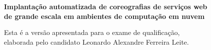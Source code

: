 \documentclass[11pt,twoside,a4paper]{book}
\begin{document}
%
%
%
\newpage
\thispagestyle{empty}
    \begin{center}
        \vspace*{2.3 cm}
        \textbf{\Large{Implantação automatizada de coreografias de serviços web \\
    de grande escala em ambientes de computação em nuvem}}\\
        \vspace*{2 cm}
    \end{center}

    \vskip 2cm

    \begin{flushright}
	Esta é a versão apresentada para o exame de qualificação,\\
	elaborada pelo candidato Leonardo Alexandre Ferreira Leite. \\
    \end{flushright}

\pagebreak
\end{document}
